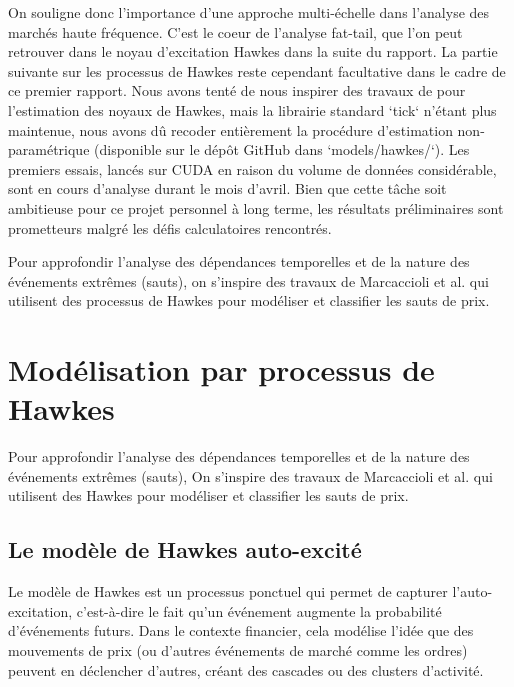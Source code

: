 \documentclass[10pt,a4paper]{article}
\theoremstyle{definition}
\theoremstyle{remark}
\begin{document}
    
On souligne donc l'importance d'une approche multi-échelle dans l'analyse des marchés haute fréquence. C'est le coeur de l'analyse fat-tail, que l'on peut retrouver dans le noyau d'excitation Hawkes dans la suite du rapport. La partie suivante sur les processus de Hawkes reste cependant facultative dans le cadre de ce premier rapport. Nous avons tenté de nous inspirer des travaux de \cite{bacry2014estimationslowlydecreasinghawkes} pour l'estimation des noyaux de Hawkes, mais la librairie standard `tick` n'étant plus maintenue, nous avons dû recoder entièrement la procédure d'estimation non-paramétrique (disponible sur le dépôt GitHub dans `models/hawkes/`). Les premiers essais, lancés sur CUDA en raison du volume de données considérable, sont en cours d'analyse durant le mois d'avril. Bien que cette tâche soit ambitieuse pour ce projet personnel à long terme, les résultats préliminaires sont prometteurs malgré les défis calculatoires rencontrés.


Pour approfondir l'analyse des dépendances temporelles et de la nature des événements extrêmes (sauts), on s'inspire des travaux de Marcaccioli et al. \cite{marcaccioli2021exogenous} qui utilisent des processus de Hawkes pour modéliser et classifier les sauts de prix.


\newpage
\section{Modélisation par processus de Hawkes}

    Pour approfondir l'analyse des dépendances temporelles et de la nature des événements extrêmes (sauts), On s'inspire des travaux de Marcaccioli et al. \cite{marcaccioli2021exogenous} qui utilisent des Hawkes pour modéliser et classifier les sauts de prix.

    \subsection{Le modèle de Hawkes auto-excité}

    Le modèle de Hawkes est un processus ponctuel qui permet de capturer l'auto-excitation, c'est-à-dire le fait qu'un événement augmente la probabilité d'événements futurs. Dans le contexte financier, cela modélise l'idée que des mouvements de prix (ou d'autres événements de marché comme les ordres) peuvent en déclencher d'autres, créant des cascades ou des clusters d'activité.
\end{document}
